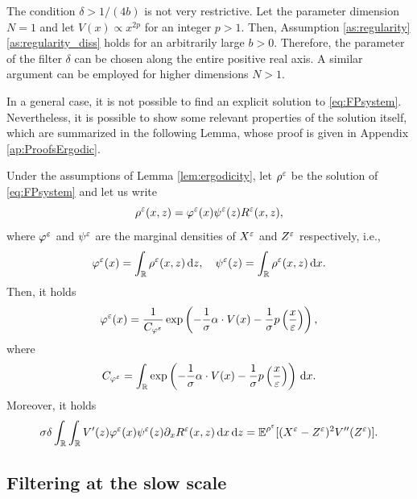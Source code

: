\documentclass[10pt]{article}
\begin{document}
\begin{remark} The condition $\delta > 1 / (4b)$ is not very restrictive. Let the parameter dimension $N = 1$ and let $V(x) \propto x^{2p}$ for an integer $p > 1$. Then, Assumption \ref{as:regularity}\ref{as:regularity_diss} holds for an arbitrarily large $b > 0$. Therefore, the parameter of the filter $\delta$ can be chosen along the entire positive real axis. A similar argument can be employed for higher dimensions $N > 1$.
\end{remark}

In a general case, it is not possible to find an explicit solution to \eqref{eq:FPsystem}. Nevertheless, it is possible to show some relevant properties of the solution itself, which are summarized in the following Lemma, whose proof is given in Appendix \ref{ap:ProofsErgodic}.

\begin{lemma}\label{lem:FPMarginal} Under the assumptions of Lemma \ref{lem:ergodicity}, let $\rho^\varepsilon$ be the solution of \eqref{eq:FPsystem} and let us write 
\begin{equation}\label{eq:densityDecomposition}
	\rho^\varepsilon(x, z) = \varphi^\varepsilon(x)\psi^\varepsilon(z)R^\varepsilon(x,z),
\end{equation}
where $\varphi^\varepsilon$ and $\psi^\varepsilon$ are the marginal densities of $X^\varepsilon$ and $Z^\varepsilon$ respectively, i.e., 
\begin{equation}
	\varphi^\varepsilon(x) = \int_{\mathbb{R}} \rho^\varepsilon(x,z) \,\mathrm{d} z, \quad  \psi^\varepsilon(z) = \int_{\mathbb{R}} \rho^\varepsilon(x,z) \,\mathrm{d} x.
\end{equation}
Then, it holds
\begin{equation}\label{eq:marginalX}
	\varphi^\varepsilon(x) = \frac{1}{C_{\varphi^\varepsilon}} \exp\left(-\frac{1}{\sigma} \alpha \cdot V(x) - \frac{1}{\sigma} p \left ( \frac{x}{\varepsilon} \right )\right),
\end{equation}
where
\begin{equation}
	C_{\varphi^\varepsilon} = \int_{\mathbb{R}} \exp\left(-\frac{1}{\sigma} \alpha \cdot V(x) - \frac{1}{\sigma} p \left ( \frac{x}{\varepsilon} \right )\right) \,\mathrm{d} x.
\end{equation}
Moreover, it holds
\begin{equation}
	\sigma \delta \int_{\mathbb{R}} \int_{\mathbb{R}} V'(z) \varphi^\varepsilon(x) \psi^\varepsilon(z) \partial_x R^\varepsilon(x,z) \,\mathrm{d} x \,\mathrm{d} z = \operatorname{\mathbb{E}}^{\rho^\varepsilon}[(X^\varepsilon - Z^\varepsilon)^2 V''(Z^\varepsilon)].
\end{equation}
\end{lemma}

\subsection{Filtering at the slow scale}\label{sec:Slow}
\end{document}
